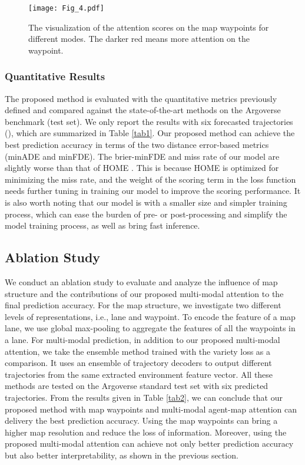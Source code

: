 \documentclass[letterpaper, 10 pt, conference]{ieeeconf}
\begin{document}
\begin{figure}[htp]
    \centering
    \texttt{[image: Fig\_4.pdf]}
    \caption{The visualization of the attention scores on the map waypoints for different modes. The darker red means more attention on the waypoint.}
    \label{fig:fig.4}
\end{figure}

\subsubsection{Quantitative Results}

The proposed method is evaluated with the quantitative metrics previously defined and compared against the state-of-the-art methods on the Argoverse benchmark (test set). We only report the results with six forecasted trajectories (), which are summarized in Table \ref{tab1}. Our proposed method can achieve the best prediction accuracy in terms of the two distance error-based metrics (minADE and minFDE). The brier-minFDE and miss rate of our model are slightly worse than that of HOME \cite{gilles2021home}. This is because HOME is optimized for minimizing the miss rate, and the weight of the scoring term in the loss function needs further tuning in training our model to improve the scoring performance. It is also worth noting that our model is with a smaller size and simpler training process, which can ease the burden of pre- or post-processing and simplify the model training process, as well as bring fast inference.

\subsection{Ablation Study}
We conduct an ablation study to evaluate and analyze the influence of map structure and the contributions of our proposed multi-modal attention to the final prediction accuracy. For the map structure, we investigate two different levels of representations, i.e., lane and waypoint. To encode the feature of a map lane, we use global max-pooling to aggregate the features of all the waypoints in a lane. For multi-modal prediction, in addition to our proposed multi-modal attention, we take the ensemble method trained with the variety loss as a comparison. It uses an ensemble of trajectory decoders to output different trajectories from the same extracted environment feature vector. All these methods are tested on the Argoverse standard test set with six predicted trajectories. From the results given in Table \ref{tab2}, we can conclude that our proposed method with map waypoints and multi-modal agent-map attention can delivery the best prediction accuracy. Using the map waypoints can bring a higher map resolution and reduce the loss of information. Moreover, using the proposed multi-modal attention can achieve not only better prediction accuracy but also better interpretability, as shown in the previous section.
\end{document}
